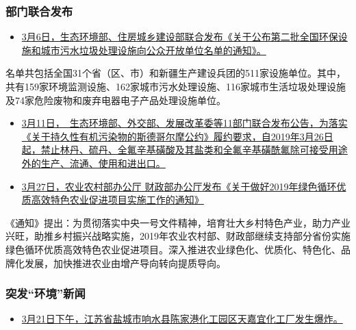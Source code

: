 \documentclass[]{book}
\providecommand{\tightlist}{%
  \setlength{\itemsep}{0pt}\setlength{\parskip}{0pt}}
\begin{document}
\hypertarget{ux90e8ux95e8ux8054ux5408ux53d1ux5e03-4}{%
\subsubsection*{部门联合发布}\label{ux90e8ux95e8ux8054ux5408ux53d1ux5e03-4}}

\begin{itemize}
\tightlist
\item
  \href{http://www.mee.gov.cn/xxgk2018/xxgk/xxgk05/201903/t20190308_694926.html}{3月6日，生态环境部、住房城乡建设部联合发布《关于公布第二批全国环保设施和城市污水垃圾处理设施向公众开放单位名单的通知》。}
\end{itemize}

名单共包括全国31个省（区、市）和新疆生产建设兵团的511家设施单位。其中，共有159家环境监测设施、162家城市污水处理设施、116家城市生活垃圾处理设施及74家危险废物和废弃电器电子产品处理设施单位。

\begin{itemize}
\item
  \href{http://www.mee.gov.cn/xxgk2018/xxgk/xxgk01/201903/t20190312_695462.html}{3月11日，　生态环境部、外交部、发展改革委等11部门联合发布公告，为落实《关于持久性有机污染物的斯德哥尔摩公约》履约要求，自2019年3月26日起，禁止林丹、硫丹、全氟辛基磺酸及其盐类和全氟辛基磺酰氟除可接受用途外的生产、流通、使用和进出口。}
\item
  \href{http://www.moa.gov.cn/gk/tzgg_1/tfw/201903/t20190327_6177367.htm}{3月27日，农业农村部办公厅 财政部办公厅发布《关于做好2019年绿色循环优质高效特色农业促进项目实施工作的通知》}
\end{itemize}

《通知》提出：为贯彻落实中央一号文件精神，培育壮大乡村特色产业，助力产业兴旺，助推乡村振兴战略实施，2019年农业农村部、财政部继续支持部分省份实施绿色循环优质高效特色农业促进项目。深入推进农业绿色化、优质化、特色化、品牌化发展，加快推进农业由增产导向转向提质导向。

\hypertarget{ux7a81ux53d1ux73afux5883ux65b0ux95fb}{%
\subsubsection*{突发``环境''新闻}\label{ux7a81ux53d1ux73afux5883ux65b0ux95fb}}

\begin{itemize}
\tightlist
\item
  \href{http://www.chinasafety.gov.cn/xw/byw/201903/t20190323_232262.shtml}{3月21日下午，江苏省盐城市响水县陈家港化工园区天嘉宜化工厂发生爆炸。}
\end{itemize}
\end{document}
